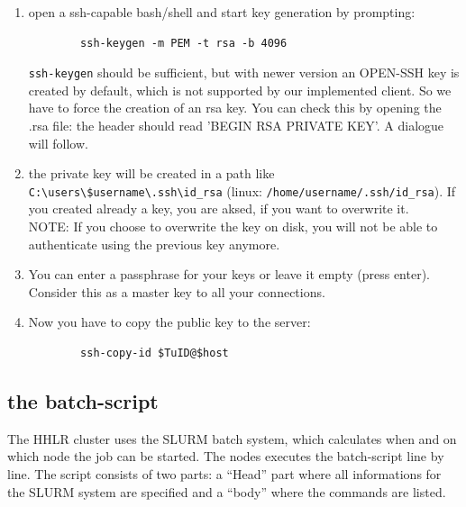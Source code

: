 \documentclass[11pt,twoside,a4paper]{fdyartcl}
\begin{document}
\begin{enumerate}
	\item open a ssh-capable bash/shell and start key generation by prompting:
	\begin{verbatim}
		ssh-keygen -m PEM -t rsa -b 4096
	\end{verbatim}
	\verb|ssh-keygen| should be sufficient, but with newer version an OPEN-SSH key is created by default, which is not supported by our implemented client.
	So we have to force the creation of an rsa key.
	You can check this by opening the .rsa file: the header should read 'BEGIN RSA PRIVATE KEY'.
	A dialogue will follow.
	\item the private key will be created in a path like \verb|C:\users\$username\.ssh\id_rsa| (linux: \verb|/home/username/.ssh/id_rsa|). If you created already a key, you are aksed, if you want to overwrite it. \\ NOTE: If you choose to overwrite the key on disk, you will not be able to authenticate using the previous key anymore.
	\item You can enter a passphrase for your keys or leave it empty (press enter). Consider this as a master key to all your connections.
	
	\item Now you have to copy the public key to the server:
	\begin{verbatim}
		ssh-copy-id $TuID@$host
	\end{verbatim}
\end{enumerate}



\subsection{the batch-script}
\label{sec:sbatch}

The HHLR cluster uses the SLURM batch system, which calculates when and on which node the job can be started. The nodes executes the batch-script line by line. The script consists of two parts: a ``Head'' part where all informations for the SLURM system are specified and a ``body'' where the commands are listed.\\
\end{document}
